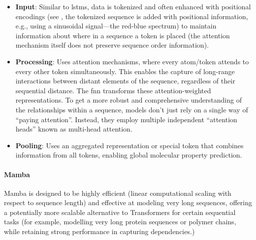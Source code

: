 \begin{itemize}
    \item \textbf{Input}: Similar to \glspl{lstm}, data is tokenized and often enhanced with positional encodings (see , the tokenized sequence is added with positional information, e.g., using a sinusoidal signal---the red-blue spectrum) to maintain information about where in a sequence a token is placed (the attention mechanism itself does not preserve sequence order information).
    \item \textbf{Processing}:  Uses attention mechanisms, where every atom/token attends to every other token simultaneously. This enables the capture of long-range interactions between distant elements of the sequence, regardless of their sequential distance. The \gls{fnn} transforms these attention-weighted representations.  To get a more robust and comprehensive understanding of the relationships within a sequence, models don't just rely on a single way of \enquote{paying attention}.  Instead, they employ multiple independent \enquote{attention heads} known as multi-head attention.
    \item \textbf{Pooling}:  Uses an aggregated representation or special token that combines information from all tokens, enabling global molecular property prediction.
\end{itemize}

\paragraph{Mamba}
Mamba\autocite{gu2023mamba0} is designed to be highly efficient (linear computational scaling with respect to sequence length) and effective at modeling very long sequences, offering a potentially more scalable alternative to Transformers for certain sequential tasks (for example, modelling very long protein sequences or polymer chains, while retaining strong performance in capturing dependencies.)

